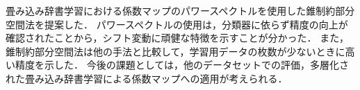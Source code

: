 畳み込み辞書学習における係数マップのパワースペクトルを使用した錐制約部分空間法を提案した．
パワースペクトルの使用は，分類器に依らず精度の向上が確認されたことから，シフト変動に頑健な特徴を示すことが分かった．
また，錐制約部分空間法は他の手法と比較して，学習用データの枚数が少ないときに高い精度を示した．
今後の課題としては，他のデータセットでの評価，多層化された畳み込み辞書学習による係数マップへの適用が考えられる．